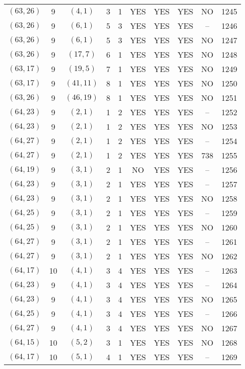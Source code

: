 \begin{longtable}{|c|c|c|c|c|c|c|c|c|c|}
$(63, 26)$ & 9 & $(4, 1)$ & 3 & 1 & YES & YES & YES & NO & 1245\\
$(63, 26)$ & 9 & $(6, 1)$ & 5 & 3 & YES & YES & YES & -- & 1246\\
$(63, 26)$ & 9 & $(6, 1)$ & 5 & 3 & YES & YES & YES & NO & 1247\\
$(63, 26)$ & 9 & $(17, 7)$ & 6 & 1 & YES & YES & YES & NO & 1248\\
$(63, 17)$ & 9 & $(19, 5)$ & 7 & 1 & YES & YES & YES & NO & 1249\\
$(63, 17)$ & 9 & $(41, 11)$ & 8 & 1 & YES & YES & YES & NO & 1250\\
$(63, 26)$ & 9 & $(46, 19)$ & 8 & 1 & YES & YES & YES & NO & 1251\\
$(64, 23)$ & 9 & $(2, 1)$ & 1 & 2 & YES & YES & YES & -- & 1252\\
$(64, 23)$ & 9 & $(2, 1)$ & 1 & 2 & YES & YES & YES & NO & 1253\\
$(64, 27)$ & 9 & $(2, 1)$ & 1 & 2 & YES & YES & YES & -- & 1254\\
$(64, 27)$ & 9 & $(2, 1)$ & 1 & 2 & YES & YES & YES & 738 & 1255\\
$(64, 19)$ & 9 & $(3, 1)$ & 2 & 1 & NO & YES & YES & -- & 1256\\
$(64, 23)$ & 9 & $(3, 1)$ & 2 & 1 & YES & YES & YES & -- & 1257\\
$(64, 23)$ & 9 & $(3, 1)$ & 2 & 1 & YES & YES & YES & NO & 1258\\
$(64, 25)$ & 9 & $(3, 1)$ & 2 & 1 & YES & YES & YES & -- & 1259\\
$(64, 25)$ & 9 & $(3, 1)$ & 2 & 1 & YES & YES & YES & NO & 1260\\
$(64, 27)$ & 9 & $(3, 1)$ & 2 & 1 & YES & YES & YES & -- & 1261\\
$(64, 27)$ & 9 & $(3, 1)$ & 2 & 1 & YES & YES & YES & NO & 1262\\
$(64, 17)$ & 10 & $(4, 1)$ & 3 & 4 & YES & YES & YES & -- & 1263\\
$(64, 23)$ & 9 & $(4, 1)$ & 3 & 4 & YES & YES & YES & -- & 1264\\
$(64, 23)$ & 9 & $(4, 1)$ & 3 & 4 & YES & YES & YES & NO & 1265\\
$(64, 25)$ & 9 & $(4, 1)$ & 3 & 4 & YES & YES & YES & -- & 1266\\
$(64, 27)$ & 9 & $(4, 1)$ & 3 & 4 & YES & YES & YES & NO & 1267\\
$(64, 15)$ & 10 & $(5, 2)$ & 3 & 1 & YES & YES & YES & NO & 1268\\
$(64, 17)$ & 10 & $(5, 1)$ & 4 & 1 & YES & YES & YES & -- & 1269\\

\end{longtable}
